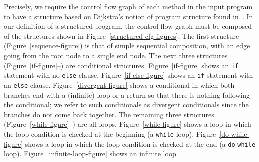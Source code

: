 Precisely, we require the control flow graph of each method in the
input program to have a structure based on Dijkstra's notion of
program structure found in~\cite{dijkstra1972}.
In our definition of a structured program, the control flow graph must
be composed of the structures shown in
Figure~\ref{structured-cfg-figures}. 
The first structure (Figure~\ref{sequence-figure}) is that of simple
sequential composition, with an edge going from the root node to a
single end node.
The next three structures
(Figure~\ref{if-figure}--) are conditional
structures. 
Figure~\ref{if-figure} shows an \texttt{if} statement with no
\texttt{else} clause. 
Figure~\ref{if-else-figure} shows an \texttt{if} statement with an
\texttt{else} clause. 
Figure~\ref{divergent-figure} shows a conditional in which both
branches end with a (infinite) loop or a return so that there is
nothing following the conditional; we refer to such conditionals as
divergent conditionals since the branches do not come back together.
The remaining three structures
(Figure~\ref{while-figure}--) are all
loops.
Figure~\ref{while-figure} shows a loop in which the loop condition is
checked at the beginning (a \texttt{while} loop).
Figure~\ref{do-while-figure} shows a loop in which the loop condition
is checked at the end (a \texttt{do}-\texttt{while} loop).
Figure~\ref{infinite-loop-figure} shows an infinite loop.

